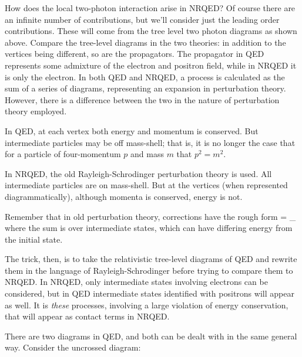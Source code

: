 How does the local two-photon interaction arise in NRQED?  Of course there are an infinite number of contributions, but we'll consider just the leading order contributions.  These will come from the tree level two photon diagrams as shown above.  Compare the tree-level diagrams in the two theories: in addition to the vertices being different, so are the propagators.  The propagator in QED represents some admixture of the electron and positron field, while in NRQED it is only the electron.
In both QED and NRQED, a process is calculated as the sum of a series of diagrams, representing an expansion in perturbation theory.  However, there is a difference between the two in the nature of perturbation theory employed.

In QED, at each vertex both energy and momentum is conserved.  But intermediate particles may be off mass-shell; that is, it is no longer the case that for a particle of four-momentum $p$ and mass $m$ that $p^2 = m^2$.

In NRQED, the old Rayleigh-Schrodinger perturbation theory is used.   All intermediate particles are on mass-shell.  But at the vertices (when represented diagrammatically), although momenta is conserved, energy is not.  


Remember that in old perturbation theory, corrections have the rough form
\beq
	\Delta =  \Sigma_ 
\eeq
where the sum is over intermediate states, which can have differing energy from the initial state.

The trick, then, is to take the relativistic tree-level diagrams of QED and rewrite them in the language of  Rayleigh-Schrodinger before trying to compare them to NRQED.  In NRQED, only intermediate states involving electrons can be considered, but in QED intermediate states identified with positrons will appear as well.  It is \emph{these} processes, involving a large violation of energy conservation, that will appear as contact terms in NRQED.  

There are two diagrams in QED, and both can be dealt with in the same general way.  Consider the uncrossed diagram:



